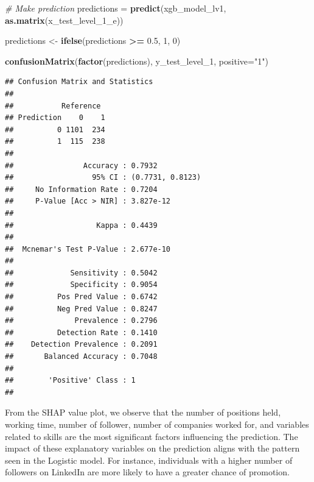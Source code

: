 \documentclass[11pt,]{article}
\newenvironment{Shaded}{\begin{snugshade}}{\end{snugshade}}
\newcommand{\AttributeTok}[1]{\textcolor[rgb]{0.13,0.29,0.53}{#1}}
\newcommand{\CommentTok}[1]{\textcolor[rgb]{0.56,0.35,0.01}{\textit{#1}}}
\newcommand{\DecValTok}[1]{\textcolor[rgb]{0.00,0.00,0.81}{#1}}
\newcommand{\FloatTok}[1]{\textcolor[rgb]{0.00,0.00,0.81}{#1}}
\newcommand{\FunctionTok}[1]{\textcolor[rgb]{0.13,0.29,0.53}{\textbf{#1}}}
\newcommand{\NormalTok}[1]{#1}
\newcommand{\OtherTok}[1]{\textcolor[rgb]{0.56,0.35,0.01}{#1}}
\newcommand{\SpecialCharTok}[1]{\textcolor[rgb]{0.81,0.36,0.00}{\textbf{#1}}}
\newcommand{\StringTok}[1]{\textcolor[rgb]{0.31,0.60,0.02}{#1}}
\begin{document}
\begin{Shaded}
\begin{Highlighting}[]
\CommentTok{\# Make prediction}
\NormalTok{predictions }\OtherTok{=} \FunctionTok{predict}\NormalTok{(xgb\_model\_lv1, }\FunctionTok{as.matrix}\NormalTok{(x\_test\_level\_1\_e))}

\NormalTok{predictions }\OtherTok{\textless{}{-}} \FunctionTok{ifelse}\NormalTok{(predictions }\SpecialCharTok{\textgreater{}=} \FloatTok{0.5}\NormalTok{, }\DecValTok{1}\NormalTok{, }\DecValTok{0}\NormalTok{)}

\FunctionTok{confusionMatrix}\NormalTok{(}\FunctionTok{factor}\NormalTok{(predictions), y\_test\_level\_1, }\AttributeTok{positive=}\StringTok{"1"}\NormalTok{)}
\end{Highlighting}
\end{Shaded}

\begin{verbatim}
## Confusion Matrix and Statistics
## 
##           Reference
## Prediction    0    1
##          0 1101  234
##          1  115  238
##                                           
##                Accuracy : 0.7932          
##                  95% CI : (0.7731, 0.8123)
##     No Information Rate : 0.7204          
##     P-Value [Acc > NIR] : 3.827e-12       
##                                           
##                   Kappa : 0.4439          
##                                           
##  Mcnemar's Test P-Value : 2.677e-10       
##                                           
##             Sensitivity : 0.5042          
##             Specificity : 0.9054          
##          Pos Pred Value : 0.6742          
##          Neg Pred Value : 0.8247          
##              Prevalence : 0.2796          
##          Detection Rate : 0.1410          
##    Detection Prevalence : 0.2091          
##       Balanced Accuracy : 0.7048          
##                                           
##        'Positive' Class : 1               
## 
\end{verbatim}

From the SHAP value plot, we observe that the number of positions held,
working time, number of follower, number of companies worked for, and
variables related to skills are the most significant factors influencing
the prediction. The impact of these explanatory variables on the
prediction aligns with the pattern seen in the Logistic model. For
instance, individuals with a higher number of followers on LinkedIn are
more likely to have a greater chance of promotion.
\end{document}
